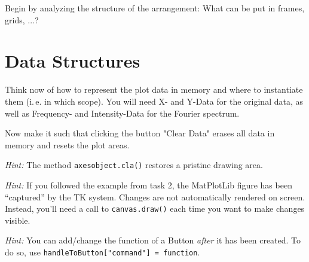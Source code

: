 \documentclass[
	english,
	fontsize=10pt,
	parskip=half,
	titlepage=true,
	DIV=12
]{scrartcl}
\newcommand*{\ie}{i.\,e.\xspace}
\begin{document}
Begin by analyzing the structure of the arrangement: What can be put in frames, grids, ...?

\section{Data Structures}
Think now of how to represent the plot data in memory and where to instantiate them (\ie in which scope). You will need X- and Y-Data for the original data, as well as Frequency- and Intensity-Data for the Fourier spectrum.

Now make it such that clicking the button "Clear Data" erases all data in memory and resets the plot areas.

\emph{Hint:} The method \texttt{axesobject.cla()} restores a pristine drawing area.

\emph{Hint:} If you followed the example from task 2, the MatPlotLib figure has been \enquote{captured} by the TK system. Changes are not automatically rendered on screen. Instead, you'll need a call to \texttt{canvas.draw()} each time you want to make changes visible.

\emph{Hint:} You can add/change the function of a Button \emph{after} it has been created. To do so, use \texttt{handleToButton["command"] = function}.
\end{document}
